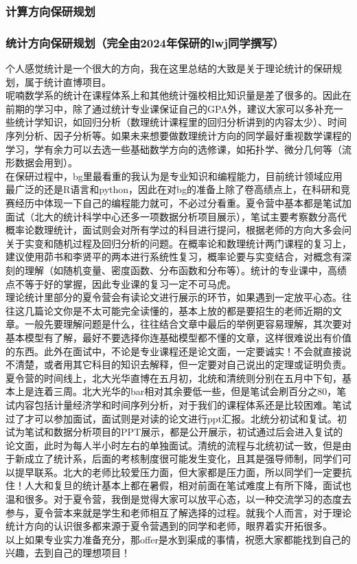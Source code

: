 \documentclass[a4paper,11pt,notitlepage]{article}
\begin{document}
\subsubsection{计算方向保研规划}

\subsubsection{统计方向保研规划（完全由2024年保研的lwj同学撰写）}
\indent 个人感觉统计是一个很大的方向，我在这里总结的大致是关于理论统计的保研规划，属于统计直博项目。\\
\indent 呢喃数学系的统计在课程体系上和其他统计强校相比知识量是差了很多的。因此在前期的学习中，除了通过统计专业课保证自己的GPA外，建议大家可以多补充一些统计学知识，如回归分析（数理统计课程里的回归分析讲到的内容太少）、时间序列分析、因子分析等。如果未来想要做数理统计方向的同学最好重视数学课程的学习，学有余力可以去选一些基础数学方向的选修课，如拓扑学、微分几何等（流形数据会用到）。\\
\indent 在保研过程中，bg里最看重的我认为是专业知识和编程能力，目前统计领域应用最广泛的还是R语言和python，因此在对bg的准备上除了卷高绩点上，在科研和竞赛经历中体现一下自己的编程能力就可，不必过分看重。夏令营中基本都是笔试加面试（北大的统计科学中心还多一项数据分析项目展示），笔试主要考察数分高代概率论数理统计，面试则会对所有学过的科目进行提问，根据老师的方向大多会问关于实变和随机过程及回归分析的问题。在概率论和数理统计两门课程的复习上，建议使用茆书和李贤平的两本进行系统性复习，概率论要与实变结合，对概念有深刻的理解（如随机变量、密度函数、分布函数和分布等）。统计的专业课中，高绩点不等于好的掌握，因此专业课的复习一定不可马虎。\\
\indent 理论统计里部分的夏令营会有读论文进行展示的环节，如果遇到一定放平心态。往往这几篇论文你是不太可能完全读懂的，基本上放的都是要招生的老师近期的文章。一般先要理解问题是什么，往往结合文章中最后的举例更容易理解，其次要对基本模型有了解，最好不要选择你连基础模型都不懂的文章，这样很难说出有价值的东西。此外在面试中，不论是专业课程还是论文面，一定要诚实！不会就直接说不清楚，或者用其它科目的知识去解释，但一定要对自己说出的定理或证明负责。\\
\indent 夏令营的时间线上，北大光华直博在五月初，北统和清统则分别在五月中下旬，基本上是连着三周。北大光华的bar相对其余要低一些，但是笔试会刷百分之80，笔试内容包括计量经济学和时间序列分析，对于我们的课程体系还是比较困难。笔试过了才可以参加面试，面试则是对读的论文进行ppt汇报。北统分初试和复试。初试为笔试和数据分析项目的PPT展示，都是公开展示，初试通过后会进入复试的论文面，此时为每人半小时左右的单独面试。清统的流程与北统初试一致，但是由于新成立了统计系，后面的考核制度很可能发生变化，且其是强导师制，同学们可以提早联系。北大的老师比较爱压力面，但大家都是压力面，所以同学们一定要抗住！人大和复旦的统计基本上都在暑假，相对前面在笔试难度上有所下降，面试也温和很多。对于夏令营，我倒是觉得大家可以放平心态，以一种交流学习的态度去参与，夏令营本来就是学生和老师相互了解选择的过程。就我个人而言，对于理论统计方向的认识很多都来源于夏令营遇到的同学和老师，眼界着实开拓很多。\\
\indent 以上如果专业实力准备充分，那offer是水到渠成的事情，祝愿大家都能找到自己的兴趣，去到自己的理想项目！
\end{document}

